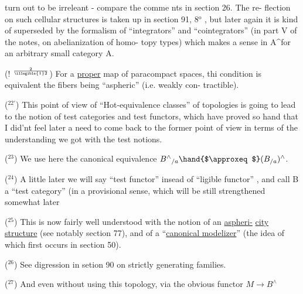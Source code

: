 
turn out to be irreleant - compare the comme nts in section 26. The re-%
flection on such cellular structures is taken up in section 91, 8$^{\text{o}}$ ,
but later again it is kind of superseded by the formalism of ``integrators''
and ``cointegrators''  (in part V of the notes,  on abelianization of homo-%
topy types) which makes a sense in A\^{}\hand{/}for an arbitrary small category A.

(! $^{2\over{\illegible{1}}{2}}$)  For a \uline{proper} map of paracompact spaces, thi
condition is equivalent  the fibers being ``aspheric'' (i.e. weakly con-%
tractible).

($^{22'}$) This point of view of ``Hot-equivalence classes'' of topologies
is going to lead to the notion of test categories and test functors,
which have proved so hand that I did'nt feel later a need to come back
to the former point of view\hand{,} in terms of the understanding  we got with
the test notions.

($^{23}$) We use here the canonical equivalence $B^{\wedge}{}_{/a} \hand{$\approxeq$} (B_{/a})^{\wedge}$.

($^{24}$) A little later we will say ``test functor'' insead of ``ligible
functor'' , and call B a ``test category'' (in a provisional sense, which
 will be still strengthened somewhat later\over{)}{,}   

($^{25}$) This is now fairly well understood with the notion of an \uline{aspheri-}%
\uline{city structure} (see notably section 77),  and of a ``\uline{canonical modelizer}''
(the idea of which first occurs in section 50).

($^{26}$) See digression in setion 90 on strictly generating families.

($^{27}$) And even without using this topology,  via the obvious functor
$M \to B^{\wedge}$ \hand{!}

